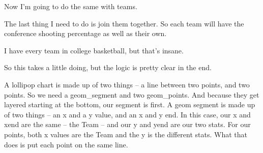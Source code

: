 \documentclass[]{book}
\newenvironment{Shaded}{\begin{snugshade}}{\end{snugshade}}
\newcommand{\DataTypeTok}[1]{\textcolor[rgb]{0.13,0.29,0.53}{#1}}
\newcommand{\KeywordTok}[1]{\textcolor[rgb]{0.13,0.29,0.53}{\textbf{#1}}}
\newcommand{\NormalTok}[1]{#1}
\newcommand{\OperatorTok}[1]{\textcolor[rgb]{0.81,0.36,0.00}{\textbf{#1}}}
\newcommand{\StringTok}[1]{\textcolor[rgb]{0.31,0.60,0.02}{#1}}
\begin{document}
Now I'm going to do the same with teams.

\begin{Shaded}
\end{Shaded}

The last thing I need to do is join them together. So each team will have the conference shooting percentage as well as their own.

\begin{Shaded}
\end{Shaded}

I have every team in college basketball, but that's insane.

\begin{Shaded}
\end{Shaded}

So this takes a little doing, but the logic is pretty clear in the end.

A lollipop chart is made up of two things -- a line between two points, and two points. So we need a geom\_segment and two geom\_points. And because they get layered starting at the bottom, our segment is first. A geom segment is made up of two things -- an x and a y value, and an x and y end. In this case, our x and xend are the same -- the Team -- and our y and yend are our two stats. For our points, both x values are the Team and the y is the different stats. What that does is put each point on the same line.
\end{document}
